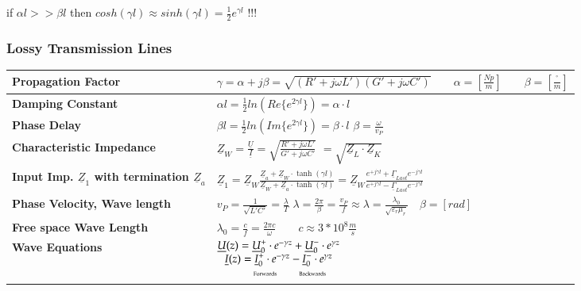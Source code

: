if $\alpha l >> \beta l$ then $cosh(\gamma l)\approx sinh(\gamma
l)=\frac{1}{2} e^{\gamma l}$ !!!

\subsubsection{Lossy Transmission Lines}
\renewcommand{\arraystretch}{1.5}
\begin{tabular}{| p{7.7cm} | l |}
	\hline
	\textbf{Propagation Factor}
	& $\gamma=\alpha+j\beta=\sqrt{(R'+j\omega L')(G'+j\omega C')}\qquad
	\alpha=[\frac{Np}{m}] \qquad \beta=[\frac{^\circ}{m}]$\\
	\hline
	\textbf{Damping Constant}
	& $\alpha l= \frac{1}{2}ln(Re\{e^{2\gamma l}\})=\alpha\cdot l$\\
	\hline
	\textbf{Phase Delay}
	& $\beta l=\frac{1}{2}ln(Im\{e^{2\gamma l}\})= \beta\cdot l$ \qquad
	$\beta=\frac{\omega}{v_P}$\\
	\hline
	\textbf{Characteristic Impedance}
	& $\underline{Z}_W=\frac{\underline{U}}{\underline{I}}=\sqrt{\frac{R'+j\omega L'}{G'+j\omega C'}}$
	$=\sqrt{\underline{Z}_L \cdot \underline{Z}_K}$\\
	\hline
	\textbf{Input Imp. $\underline{Z}_1$  with termination $\underline{Z}_a$} &
	$\underline{Z}_1 = \underline{Z}_W
	\frac{\underline{Z}_a+\underline{Z}_W \cdot \tanh(\gamma
		l)}{\underline{Z}_W+\underline{Z}_a \cdot \tanh(\gamma l)}
	= \underline{Z}_W \frac{e^{+j \gamma l} + \underline{\Gamma}_{Last} e^{- j \gamma l}}
	{e^{+j \gamma l} - \underline{\Gamma}_{Last} e^{- j \gamma l}}$\\
	\hline
	\textbf{Phase Velocity, Wave length}
	& $v_P=\frac{1}{\sqrt{L'C'}}=\frac{\lambda}{T}$ \qquad
	\qquad $\lambda=\frac{2\pi}{\beta}=\frac{v_P}{f} \approx
	\lambda=\frac{\lambda_0}{\sqrt{\varepsilon_r \mu_r}} \quad \beta=[rad]$\\
	\hline
	\textbf{Free space Wave Length}
	& $\lambda_0=\frac{c}{f}=\frac{2\pi c}{\omega} \qquad c\approx 3*10^8 \frac{m}{s}$\\
	\hline
	\textbf{Wave Equations}
	& $\begin{matrix}
	\underline{U}(z)=\underline{U}^+_0 \cdot e^{-\gamma z} + \underline{U}^-_0 \cdot e^{\gamma z}\\
	\underline{I}(z)=\underline{I}^+_0 \cdot e^{-\gamma z} - \underline{I}^-_0 \cdot e^{\gamma z}\\
	\qquad \text{\tiny Forwards}\qquad\text{\tiny Backwards}
	\end{matrix}$\\
	\hline

\end{tabular}
